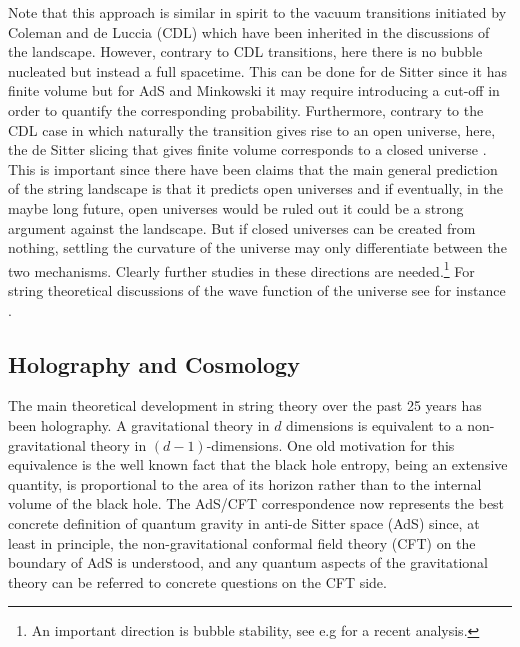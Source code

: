 Note that this approach is similar in spirit to the vacuum transitions initiated by Coleman and de Luccia (CDL) which have been inherited in the discussions of the landscape. However, contrary to CDL transitions, here there is no bubble nucleated but instead a full spacetime. This can be done for de Sitter since it has finite volume but for AdS and Minkowski it may require introducing a cut-off in order to quantify the corresponding probability. Furthermore, contrary to the CDL case in which naturally the transition gives rise to an open universe, here, the de Sitter slicing that gives finite volume corresponds to a closed universe \cite{Hartle:2013oda,Cespedes:2020xpn}. This is important since there have been claims that the main general prediction of the string landscape is that it predicts open universes \cite{Freivogel:2005vv,Kleban:2012ph} and if eventually, in the maybe long future, open universes would be ruled out it could  be a strong argument against the landscape. But if closed universes can be created from nothing, settling the curvature of the universe may only differentiate between the two mechanisms. Clearly further studies in these directions are needed.\footnote{An important direction is
bubble stability, see e.g \cite{Johnson:2019tgc} for a recent analysis.} For string theoretical discussions of the wave function of the universe see for instance \cite{Ooguri:2005vr,Brustein:2005yn}.

\subsection{Holography and Cosmology}

The main theoretical development in string theory over the past 25 years has been holography. A gravitational theory in $d$ dimensions is equivalent to a non-gravitational theory in $(d-1)$-dimensions. One old motivation for this equivalence is the well known fact that the black hole entropy, being an extensive quantity, is proportional to the area of its horizon rather than to the internal volume of the black hole. 
The AdS/CFT correspondence now represents the best concrete definition of quantum gravity in anti-de Sitter space (AdS) since, at least in principle, the non-gravitational conformal field theory (CFT) on the boundary of AdS is understood, and any quantum aspects of the gravitational theory can be referred to concrete questions on the CFT side.

